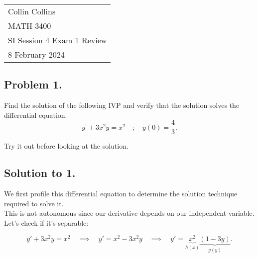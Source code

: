 \documentclass[a4paper,12pt]{article} %
\begin{document}



\thispagestyle{empty} %

\begin{tabular}{p{15.5cm}} %
\\ Collin Collins \\
MATH 3400\\
SI Session 4 Exam 1 Review\\
8 February 2024 \\
\hline %

\end{tabular} 

\subsection*{Problem 1.}

Find the solution of the following IVP and verify that the solution solves the differential equation.
$$ y^{\prime}+3 x^2 y=x^2 \quad;\quad y(0) = \frac{4}{3}. $$

Try it out before looking at the solution.

\pagebreak

\subsection*{Solution to 1.}
We first profile this differential equation to determine the solution technique required to solve it.\\

This is not autonomous since our derivative depends on our independent variable.\\

Let's check if it's separable:

$$ y' + 3x^2y = x^2 \quad\implies\quad y' = x^2 - 3x^2y \quad\implies\quad  y'=\underbrace{x^2}_{h(x)}\underbrace{(1-3y)}_{g(y)}. $$
\end{document}
